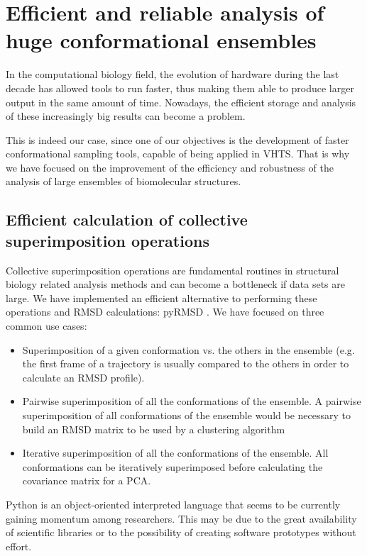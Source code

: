 \section[Efficient and reliable analysis]{Efficient and reliable analysis of huge conformational ensembles}

In the computational biology field,  the evolution of hardware during the last decade has allowed tools to run faster, thus making them able to produce larger output in the same amount of time. Nowadays, the efficient storage and analysis of these increasingly big results can become a problem.
 
This is indeed our case, since one of our objectives is the development of faster conformational sampling tools, capable of being applied in VHTS. That is why we have focused on the improvement of the efficiency and robustness of the analysis of large ensembles of biomolecular
structures.

\subsection{Efficient calculation of collective superimposition operations}

Collective superimposition operations are fundamental routines in structural biology related
analysis methods and can become a bottleneck if data sets are large. We have implemented an efficient alternative to performing these operations and RMSD calculations:
pyRMSD \cite{gil_pyrmsd_2013-1}. We have focused on three common use cases:

\begin{itemize}
\item Superimposition of a given conformation vs. the others in the ensemble (e.g. the first frame of a trajectory is usually
compared to the others in order to calculate an RMSD profile).
\item Pairwise superimposition of all the conformations of the ensemble. A pairwise superimposition of all conformations
of the ensemble would be necessary to build an RMSD matrix to be used by a clustering algorithm
\item Iterative superimposition of all the conformations of the ensemble. All conformations can be iteratively
superimposed before calculating the covariance matrix for a PCA. 
\end{itemize}
Python is an object-oriented interpreted language that seems to be currently gaining momentum among researchers. This may be due to the great availability of scientific libraries or to the possibility of creating software prototypes without effort. 

